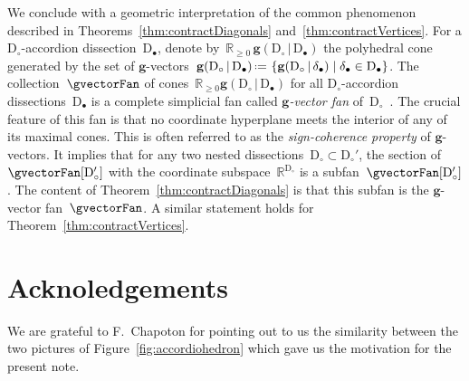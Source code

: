 \documentclass{amsart}
\theoremstyle{definition}
\newcommand{\R}{\mathbb{R}} %
\renewcommand{\b}[1]{\mathbf{#1}} %
\newcommand{\set}[2]{\left\{ #1 \;\middle|\; #2 \right\}} %
\newcommand{\eqdef}{\mbox{\,\raisebox{0.2ex}{\scriptsize\ensuremath{\mathrm:}}\ensuremath{=}\,}} %
\newcommand{\fref}[1]{Figure~\ref{#1}} %
\newcommand{\darkblue}{\color{darkblue}} %
\newcommand{\defn}[1]{\textsl{\darkblue #1}} %
\newcommand{\dissection}{\mathrm{D}} %
\newcommand{\gvector}[2]{\mathbf{g}(#1 \,|\, #2)} %
\begin{document}
We conclude with a geometric interpretation of the common phenomenon described in Theorems~\ref{thm:contractDiagonals} and~\ref{thm:contractVertices}.
For a $\dissection_\circ$-accordion dissection~$\dissection_\bullet$, denote by~$\R_{\ge0}\,\gvector{\dissection_\circ}{\dissection_\bullet}$ the polyhedral cone generated by the set of $\b{g}$-vectors~$\gvector{\dissection_\circ}{\dissection_\bullet} \eqdef \set{\gvector{\dissection_\circ}{\delta_\bullet}}{\delta_\bullet \in \dissection_\bullet}$. The collection~$\gvectorFan$ of cones~$\R_{\ge0}\gvector{\dissection_\circ}{\dissection_\bullet}$ for all $\dissection_\circ$-accordion dissections~$\dissection_\bullet$
is a complete simplicial fan called \defn{$\b{g}$-vector fan} of~$\dissection_\circ$~\cite{MannevillePilaud-accordion}.
The crucial feature of this fan is that no coordinate hyperplane meets the interior of any of its maximal cones.
This is often referred to as the \defn{sign-coherence property} of $\b{g}$-vectors.
It implies that for any two nested dissections~$\dissection_\circ \subset \dissection_\circ'$, the section of~$\gvectorFan[\dissection_\circ']$ with the coordinate subspace~$\R^{\dissection_\circ}$ is a subfan~$\gvectorFan[\dissection_\circ']$.
The content of Theorem~\ref{thm:contractDiagonals} is that this subfan is the $\b{g}$-vector fan~$\gvectorFan$.
A similar statement holds for Theorem~\ref{thm:contractVertices}.


\section*{Acknoledgements}

We are grateful to F.~Chapoton for pointing out to us the similarity between the two pictures of \fref{fig:accordiohedron} which gave us the motivation for the present note.




\label{sec:biblio}
\end{document}
